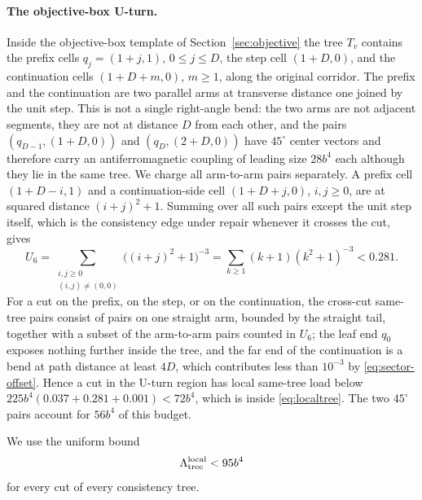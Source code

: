 \documentclass[12pt,a4paper]{article}
\begin{document}
\paragraph{The objective-box U-turn.}
Inside the objective-box template of Section~\ref{sec:objective} the tree $T_v$ contains the prefix cells $q_j=(1+j,1)$, $0\le j\le D$, the step cell $(1+D,0)$, and the continuation cells $(1+D+m,0)$, $m\ge1$, along the original corridor.  The prefix and the continuation are two parallel arms at transverse distance one joined by the unit step.  This is not a single right-angle bend: the two arms are not adjacent segments, they are not at distance $D$ from each other, and the pairs $(q_{D-1},(1+D,0))$ and $(q_D,(2+D,0))$ have $45^\circ$ center vectors and therefore carry an antiferromagnetic coupling of leading size $28b^4$ each although they lie in the same tree.  We charge all arm-to-arm pairs separately.  A prefix cell $(1+D-i,1)$ and a continuation-side cell $(1+D+j,0)$, $i,j\ge0$, are at squared distance $(i+j)^2+1$.  Summing over all such pairs except the unit step itself, which is the consistency edge under repair whenever it crosses the cut, gives
\begin{equation}\label{eq:Usum}
 U_6=\sum_{\substack{i,j\ge0\\(i,j)\ne(0,0)}}\bigl((i+j)^2+1\bigr)^{-3}
 =\sum_{k\ge1}(k+1)(k^2+1)^{-3}<0.281.
\end{equation}
For a cut on the prefix, on the step, or on the continuation, the cross-cut same-tree pairs consist of pairs on one straight arm, bounded by the straight tail, together with a subset of the arm-to-arm pairs counted in $U_6$; the leaf end $q_0$ exposes nothing further inside the tree, and the far end of the continuation is a bend at path distance at least $4D$, which contributes less than $10^{-3}$ by \eqref{eq:sector-offset}.  Hence a cut in the U-turn region has local same-tree load below $225b^4(0.037+0.281+0.001)<72b^4$, which is inside \eqref{eq:localtree}.  The two $45^\circ$ pairs account for $56b^4$ of this budget.

We use the uniform bound
\begin{equation}\label{eq:localtree-round}
 \Lambda_{\rm tree}^{\rm local}<95b^4
\end{equation}
for every cut of every consistency tree.
\end{document}
